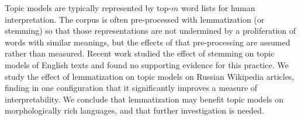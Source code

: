 Topic models are typically represented by top-$m$ word lists for human
interpretation.  The corpus is often pre-processed with lemmatization
(or stemming)
so that those representations are not undermined by a proliferation of
words with similar meanings, but the effects of that pre-processing are
assumed rather than measured.  Recent work studied the effect of
stemming on topic models of English texts
and found no supporting evidence for this practice.  We study the
effect of lemmatization on topic models on Russian Wikipedia articles,
finding in one configuration that it significantly improves a measure
of interpretability.  We conclude that lemmatization may benefit
topic models on morphologically rich languages, and that further
investigation is needed.
